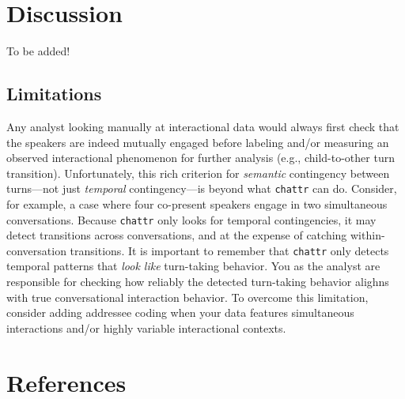\documentclass[10pt, letterpaper]{article}
\begin{document}
\hypertarget{discussion}{%
\section{Discussion}\label{discussion}}

To be added!

\hypertarget{limitations}{%
\subsection{Limitations}\label{limitations}}

Any analyst looking manually at interactional data would always first
check that the speakers are indeed mutually engaged before labeling
and/or measuring an observed interactional phenomenon for further
analysis (e.g., child-to-other turn transition). Unfortunately, this
rich criterion for \emph{semantic} contingency between turns---not just
\emph{temporal} contingency---is beyond what \texttt{chattr} can do.
Consider, for example, a case where four co-present speakers engage in
two simultaneous conversations. Because \texttt{chattr} only looks for
temporal contingencies, it may detect transitions across conversations,
and at the expense of catching within-conversation transitions. It is
important to remember that \texttt{chattr} only detects temporal
patterns that \emph{look like} turn-taking behavior. You as the analyst
are responsible for checking how reliably the detected turn-taking
behavior alighns with true conversational interaction behavior. To
overcome this limitation, consider adding addressee coding when your
data features simultaneous interactions and/or highly variable
interactional contexts.

\hypertarget{references}{%
\section{References}\label{references}}

\setlength{\parindent}{-0.1in} 
\setlength{\leftskip}{0.125in}

\noindent


\end{document}
